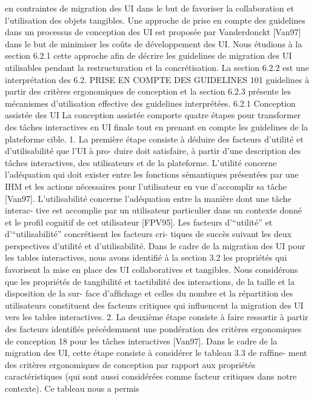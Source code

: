 \documentclass{article}
\begin{document}
en contraintes de migration des UI dans le but de favoriser la collaboration et l’utilisation des objets
tangibles.
Une approche de prise en compte des guidelines dans un processus de conception des UI est
proposée par Vanderdonckt [Van97] dans le but de minimiser les coûts de développement des UI.
Nous étudions à la section 6.2.1 cette approche aﬁn de décrire les guidelines de migration des UI
utilisables pendant la restructuration et la concrétisation. La section 6.2.2 est une interprétation des
6.2. PRISE EN COMPTE DES GUIDELINES
101
guidelines à partir des critères ergonomiques de conception et la section 6.2.3 présente les mécanismes
d’utilisation effective des guidelines interprétées.
6.2.1
Conception assistée des UI
La conception assistée comporte quatre étapes pour transformer des tâches interactives en UI
ﬁnale tout en prenant en compte les guidelines de la plateforme cible.
1. La première étape consiste à déduire des facteurs d’utilité et d’utilisabilité que l’UI à pro-
duire doit satisfaire, à partir d’une description des tâches interactives, des utilisateurs et de
la plateforme. L’utilité concerne l’adéquation qui doit exister entre les fonctions sémantiques
présentées par une IHM et les actions nécessaires pour l’utilisateur en vue d’accomplir sa
tâche [Van97]. L’utilisabilité concerne l’adéquation entre la manière dont une tâche interac-
tive est accomplie par un utilisateur particulier dans un contexte donné et le proﬁl cognitif de
cet utilisateur [FPV95]. Les facteurs d’“utilité” et d’“utilisabilité” concrétisent les facteurs cri-
tiques de succès suivant les deux perspectives d’utilité et d’utilisabilité. Dans le cadre de la
migration des UI pour les tables interactives, nous avons identiﬁé à la section 3.2 les propriétés
qui favorisent la mise en place des UI collaboratives et tangibles. Nous considérons que les
propriétés de tangibilité et tactibilité des interactions, de la taille et la disposition de la sur-
face d’afﬁchage et celles du nombre et la répartition des utilisateurs constituent des facteurs
critiques qui inﬂuencent la migration des UI vers les tables interactives.
2. La deuxième étape consiste à faire ressortir à partir des facteurs identiﬁés précédemment une
pondération des critères ergonomiques de conception 18 pour les tâches interactives [Van97].
Dans le cadre de la migration des UI, cette étape consiste à considérer le tableau 3.3 de rafﬁne-
ment des critères ergonomiques de conception par rapport aux propriétés caractéristiques (qui
sont aussi considérées comme facteur critiques dans notre contexte). Ce tableau nous a permis
\end{document}

